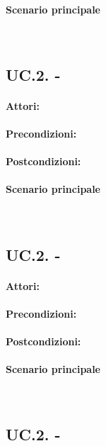 \documentclass[10pt,a4paper,headinclude,footinclude,hidelinks]{scrreprt} %
\begin{document}
	\paragraph{Scenario principale} \hfill \\

	\subsection[UC.2.]{UC.2. - }
	\label{ch:stage:ar:uc:2_}
	\paragraph{Attori:}
	\paragraph{Precondizioni:}
	\paragraph{Postcondizioni:}
	\paragraph{Scenario principale} \hfill \\

	\subsection[UC.2.]{UC.2. - }
	\label{ch:stage:ar:uc:2_}
	\paragraph{Attori:}
	\paragraph{Precondizioni:}
	\paragraph{Postcondizioni:}
	\paragraph{Scenario principale} \hfill \\

	\subsection[UC.2.]{UC.2. - }
	\label{ch:stage:ar:uc:2_}
\end{document}
